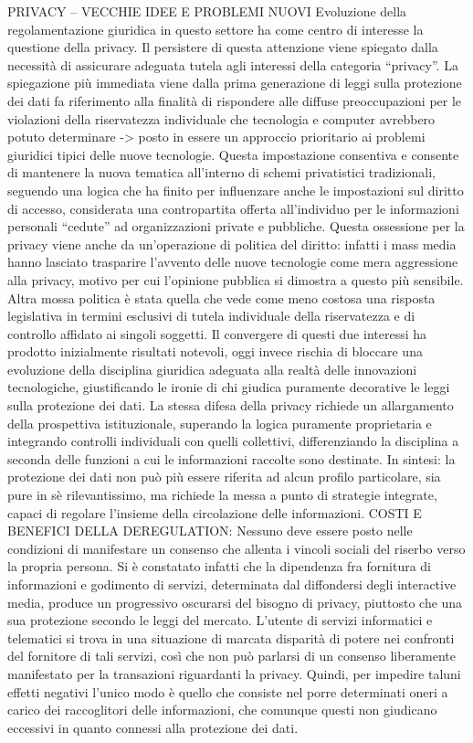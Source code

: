 PRIVACY – VECCHIE IDEE E PROBLEMI NUOVI
Evoluzione della regolamentazione giuridica in questo settore ha come centro di interesse la questione della privacy. Il persistere di questa attenzione viene spiegato dalla necessità di assicurare adeguata tutela agli interessi della categoria “privacy”. La spiegazione più immediata viene dalla prima generazione di leggi sulla protezione dei dati fa riferimento alla finalità di rispondere alle diffuse preoccupazioni per le violazioni della riservatezza individuale che tecnologia e computer avrebbero potuto determinare -> posto in essere un approccio prioritario ai problemi giuridici tipici delle nuove tecnologie.
Questa impostazione consentiva e consente di mantenere la nuova tematica all’interno di schemi privatistici tradizionali, seguendo una logica che ha finito per influenzare anche le impostazioni sul diritto di accesso, considerata una contropartita offerta all’individuo per le informazioni personali “cedute” ad organizzazioni private e pubbliche. 
Questa ossessione per la privacy viene anche da un’operazione di politica del diritto: infatti i mass media hanno lasciato trasparire l’avvento delle nuove tecnologie come mera aggressione alla privacy, motivo per cui l’opinione pubblica si dimostra a questo più sensibile. Altra mossa politica è stata quella che vede come meno costosa una risposta legislativa in termini esclusivi di tutela individuale della riservatezza e di controllo affidato ai singoli soggetti.
Il convergere di questi due interessi ha prodotto inizialmente risultati notevoli, oggi invece rischia di bloccare una evoluzione della disciplina giuridica adeguata alla realtà delle innovazioni tecnologiche, giustificando le ironie di chi giudica puramente decorative le leggi sulla protezione dei dati. 
La stessa difesa della privacy richiede un allargamento della prospettiva istituzionale, superando la logica puramente proprietaria e integrando controlli individuali con quelli collettivi, differenziando la disciplina a seconda delle funzioni a cui le informazioni raccolte sono destinate.
In sintesi: la protezione dei dati non può più essere riferita ad alcun profilo particolare, sia pure in sè rilevantissimo, ma richiede la messa a punto di strategie integrate, capaci di regolare l’insieme della circolazione delle informazioni. 
COSTI E BENEFICI DELLA DEREGULATION:
Nessuno deve essere posto nelle condizioni di manifestare un consenso che allenta i vincoli sociali del riserbo verso la propria persona. Si è constatato infatti che la dipendenza fra fornitura di informazioni e godimento di servizi, determinata dal diffondersi degli interactive media, produce un progressivo oscurarsi del bisogno di privacy, piuttosto che una sua protezione secondo le leggi del mercato. L’utente di servizi informatici e telematici si trova in una situazione di marcata disparità di potere nei confronti del fornitore di tali servizi, così che non può parlarsi di un consenso liberamente manifestato per la transazioni riguardanti la privacy. Quindi, per impedire taluni effetti negativi l’unico modo è quello che consiste nel porre determinati oneri a carico dei raccoglitori delle informazioni, che comunque questi non giudicano eccessivi in quanto connessi alla protezione dei dati.
